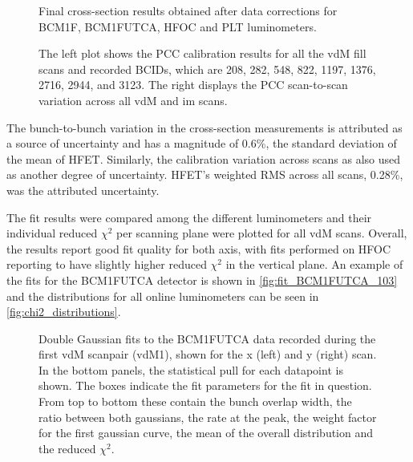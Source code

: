 \begin{figure}[!htb]
	\centering
	\caption[Final cross-section results for other online luminometers]{Final cross-section results obtained after data corrections for BCM1F, BCM1FUTCA, HFOC and PLT luminometers.}
	\label{fig:all_Corr_luminometer_xsec}
\end{figure}

\begin{figure}[!htb]
	\centering
	\caption[PCC calibration results]{The left plot shows the PCC calibration results for all the vdM fill scans and recorded BCIDs, which are 208, 282, 548, 822, 1197, 1376, 2716, 2944, and 3123. The right displays the PCC scan-to-scan variation across all vdM and im scans.
	}
	\label{fig:cross_section_results_pcc}
\end{figure}

The bunch-to-bunch variation in the cross-section measurements is attributed as a source of uncertainty and has a magnitude of 0.6\%, the standard deviation of the mean of HFET. Similarly, the calibration variation across scans as also used as another degree of uncertainty. HFET's weighted RMS across all scans, 0.28\%, was the attributed uncertainty.

The fit results were compared among the different luminometers and their individual reduced $\chi^2$ per scanning plane were plotted for all vdM scans. Overall, the results report good fit quality for both axis, with fits performed on HFOC reporting to have slightly higher reduced $\chi^2$ in the vertical plane. An example of the fits for the BCM1FUTCA detector is shown in \autoref{fig:fit_BCM1FUTCA_103} and the distributions for all online luminometers can be seen in \autoref{fig:chi2_distributions}.

\begin{figure}[!htb]
	\centering
	\caption[Double Gaussian fits for BCM1FUTCA]{Double Gaussian fits to the BCM1FUTCA data recorded during the first vdM scanpair (vdM1), shown for the x (left) and y (right) scan. In the bottom panels, the statistical pull for each datapoint is shown. The boxes indicate the fit parameters for the fit in question. From top to bottom these contain the bunch overlap width, the ratio between both gaussians, the rate at the peak, the weight factor for the first gaussian curve, the mean of the overall distribution and the reduced $\chi^2$.}
	\label{fig:fit_BCM1FUTCA_103}
\end{figure}

